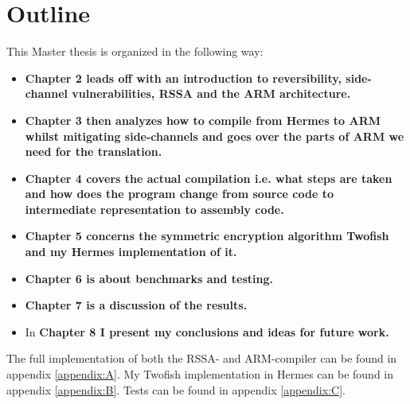 \section{Outline}
This Master thesis is organized in the following way:
\begin{itemize}
  \item \bf{Chapter 2} leads off with an introduction to reversibility, side-channel vulnerabilities, RSSA and the ARM architecture.
  \item \bf{Chapter 3} then analyzes how to compile from Hermes to ARM whilst mitigating side-channels and goes over the parts of ARM we need for the translation.
  \item \bf{Chapter 4} covers the actual compilation i.e. what steps are taken and how does the program change from source code to intermediate representation to assembly code.
  \item \bf{Chapter 5} concerns the symmetric encryption algorithm Twofish and my Hermes implementation of it.
  \item \bf{Chapter 6} is about benchmarks and testing.
  \item \bf{Chapter 7} is a discussion of the results.
  \item In \bf{Chapter 8} I present my conclusions and ideas for future work.
\end{itemize}
The full implementation of both the RSSA- and ARM-compiler can be found in appendix \ref{appendix:A}.
My Twofish implementation in Hermes can be found in appendix \ref{appendix:B}.
Tests can be found in appendix \ref{appendix:C}.
